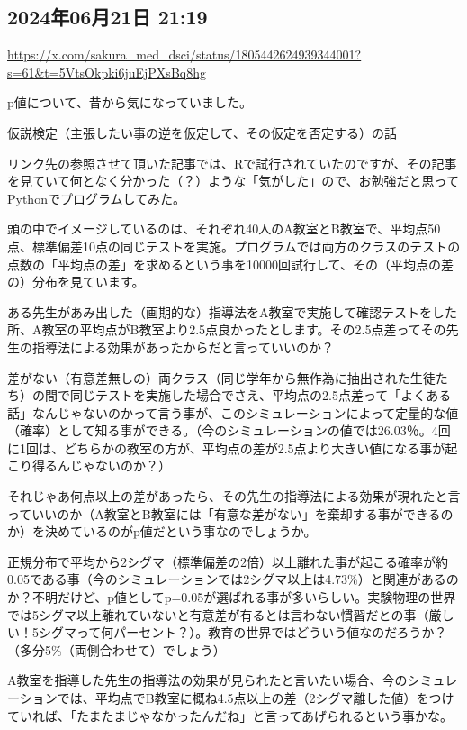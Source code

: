 \documentclass[facebook_diary.tex]{subfiles}
\begin{document}
\subsection*{2024年06月21日 21:19}

\url{https://x.com/sakura_med_dsci/status/1805442624939344001?s=61&t=5VtsOkpki6juEjPXsBq8hg}




p値について、昔から気になっていました。

仮説検定（主張したい事の逆を仮定して、その仮定を否定する）の話


リンク先の参照させて頂いた記事では、Rで試行されていたのですが、その記事を見ていて何となく分かった（？）ような「気がした」ので、お勉強だと思ってPythonでプログラムしてみた。


頭の中でイメージしているのは、それぞれ40人のA教室とB教室で、平均点50点、標準偏差10点の同じテストを実施。プログラムでは両方のクラスのテストの点数の「平均点の差」を求めるという事を10000回試行して、その（平均点の差の）分布を見ています。


ある先生があみ出した（画期的な）指導法をA教室で実施して確認テストをした所、A教室の平均点がB教室より2.5点良かったとします。その2.5点差ってその先生の指導法による効果があったからだと言っていいのか？


差がない（有意差無しの）両クラス（同じ学年から無作為に抽出された生徒たち）の間で同じテストを実施した場合でさえ、平均点の2.5点差って「よくある話」なんじゃないのかって言う事が、このシミュレーションによって定量的な値（確率）として知る事ができる。（今のシミュレーションの値では26.03％。4回に1回は、どちらかの教室の方が、平均点の差が2.5点より大きい値になる事が起こり得るんじゃないのか？）


それじゃあ何点以上の差があったら、その先生の指導法による効果が現れたと言っていいのか（A教室とB教室には「有意な差がない」を棄却する事ができるのか）を決めているのがp値だという事なのでしょうか。


正規分布で平均から2シグマ（標準偏差の2倍）以上離れた事が起こる確率が約0.05である事（今のシミュレーションでは2シグマ以上は4.73\%）と関連があるのか？不明だけど、p値としてp=0.05が選ばれる事が多いらしい。実験物理の世界では5シグマ以上離れていないと有意差が有るとは言わない慣習だとの事（厳しい！5シグマって何パーセント？）。教育の世界ではどういう値なのだろうか？（多分5\%（両側合わせて）でしょう）


A教室を指導した先生の指導法の効果が見られたと言いたい場合、今のシミュレーションでは、平均点でB教室に概ね4.5点以上の差（2シグマ離した値）をつけていれば、「たまたまじゃなかったんだね」と言ってあげられるという事かな。
\end{document}
